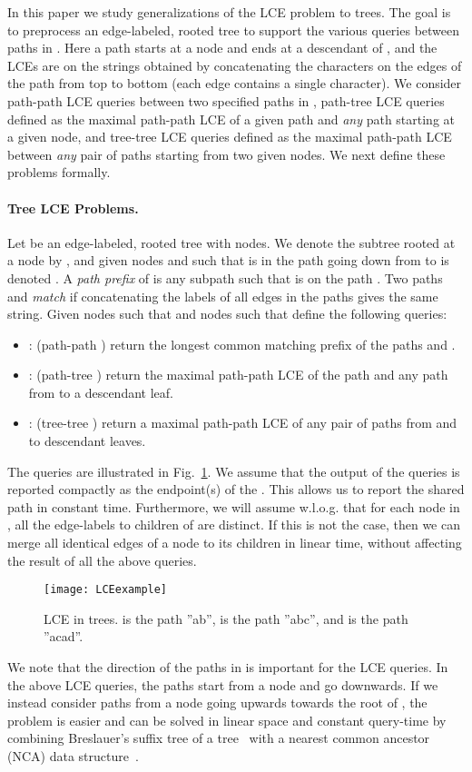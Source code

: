 \documentclass [10pt]{article}
\begin{document}
In this paper we study generalizations of the LCE problem to trees. The goal is to preprocess an edge-labeled, rooted tree  to support the various  queries between paths in . Here a path starts at a node  and ends at a descendant of , and the LCEs are on the strings obtained by concatenating the characters on the edges of the path from top to bottom (each edge contains a single character). We consider path-path LCE queries between two specified paths in , path-tree LCE queries defined as the maximal path-path LCE of a given path and \emph{any} path starting at a given node, and tree-tree LCE queries defined as the maximal path-path LCE between \emph{any} pair of paths starting from two given nodes.   We next define these problems formally. 


\paragraph{\bf Tree LCE Problems.}
Let  be an edge-labeled, rooted tree with  nodes. 
We denote the subtree rooted at a node  by , and  given nodes  and  such that  is in  the path going down from  to  is denoted . A \emph{path prefix} of  is any subpath  such that  is on the path . Two paths  and  \emph{match} if  concatenating the labels of all edges in the paths gives the same string. Given nodes   such that  and nodes  such that   define the following queries:
\begin{itemize}
\item : (path-path ) return the longest common matching prefix of the paths  and .
\item : (path-tree ) return the maximal path-path LCE of the path  and any path from  to a descendant leaf.
\item : (tree-tree ) return a maximal path-path LCE of any pair of paths from  and  to  descendant leaves.
\end{itemize}
The queries are illustrated in Fig.~\ref{fig:LCEexample}. We assume that the output of the queries is reported compactly as the endpoint(s) of the . This allows us to report the shared path in constant time. Furthermore, we will assume w.l.o.g. that for each node  in , all the edge-labels to children of   are distinct. If this is not the case, then we can merge all identical edges of a node to its children in linear time, without affecting the result of all the above  queries. 


\begin{figure}[t] \centering
   \texttt{[image: LCEexample]} 
   \caption{LCE in trees.  is the path ''ab'',  is the path ''abc'', and  is the path ''acad''.}
   \label{fig:LCEexample}
\end{figure}
We note that the direction of the paths in  is important for the LCE queries. In the above LCE queries, the paths start from a node and go downwards. If we instead consider paths from a node going upwards towards the root of , the problem is easier and can be solved in linear space and constant query-time by combining Breslauer's suffix tree of a tree~\cite{Breslauer1998} with a nearest common ancestor (NCA) data structure~\cite{HT1984}.
\end{document}
